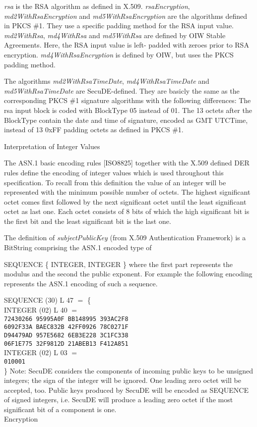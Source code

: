 {\em rsa} is the RSA algorithm as defined in X.509. {\em rsaEncryption}, 
{\em md2WithRsaEncryption}
and {\em md5With\-RsaEncryption} are the algorithms defined in PKCS \#1. 
They use a specific
padding method for the RSA input value. {\em md2WithRsa}, {\em md4WithRsa} 
and {\em md5WithRsa}
are defined by OIW Stable Agreements. Here, the RSA input value is left-
padded with zeroes
prior to RSA encryption. {\em md4WithRsaEncryption} is defined by OIW, but 
uses the
PKCS padding method.

The algorithms {\em md2WithRsaTimeDate}, {\em md4WithRsaTimeDate} and {\em 
md5WithRsaTimeDate}
are SecuDE-defined. They are basicly the same as the corresponding PKCS \#1 
signature algorithms
with the following differences:
\be
\m The rsa input block is coded with BlockType 05 instead of 01.
\m The 13 octets after the BlockType contain the date and time of 
signature, encoded
   as GMT UTCTime, instead of 13 0xFF padding octets as defined in PKCS 
\#1.
\ee

Interpretation of Integer Values

The ASN.1 basic encoding rules [ISO8825] together with the X.509 defined 
DER rules
define the encoding of integer values
which is used throughout this specification. To recall from this
definition the value of an integer will be represented with the minimum
possible number of octets.  The highest significant octet comes first
followed by the next significant octet until the least significant
octet as last one. Each octet consists of 8 bits of which the high
significant bit is the first bit and the least significant bit is the
last one.

The definition of {\em subjectPublicKey} (from X.509 Authentication 
Framework) is
a BitString comprising the ASN.1 encoded type of

\bc
	SEQUENCE \{ INTEGER, INTEGER \}
\ec
\noindent
where the first part represents the modulus and the second the public 
exponent.
For example the following encoding represents the ASN.1 encoding of such a
sequence.

\btab
	\1 SEQUENCE (30) L 47 $=$ \{            \\
	\2      INTEGER (02) L 40 $=$           \\
	\3              {\tt 72430266 95995A0F BB148995 393AC2F8 }\\
	\3              {\tt 6092F33A BAEC832B 42FF0926 78C0271F }\\
	\3              {\tt D94479AD 957E5682 6EB3E228 3C1FC338 }\\
	\3              {\tt 06F1E775 32F9812D 21ABEB13 F412A851 }\\
	\2      INTEGER (02) L 03 $=$           \\
	\3              {\tt 010001    }              \\
	\1 \}
\etab
\noindent
Note: SecuDE considers the components of incoming public keys to be 
unsigned integers;
the sign of the integer will be ignored. One leading zero octet will be 
accepted, too.
Public keys produced by SecuDE will be encoded as SEQUENCE of signed 
integers, i.e.
SecuDE will produce a leading zero octet if the most significant bit of a 
component
is one.
\\ [1em]
Encryption

